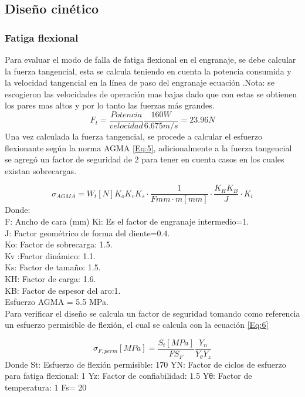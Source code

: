 \subsection*{Diseño cinético}
\subsubsection*{Fatiga flexional}
Para evaluar el modo de falla de fatiga flexional en el engranaje, se debe calcular la fuerza tangencial, esta se calcula teniendo en cuenta la potencia consumida y la velocidad tangencial en la línea de paso del engranaje ecuación .Nota: se escogieron las velocidades de operación mas bajas dado que con estas se obtienen los pares mas altos y por lo tanto las fuerzas más grandes.
\begin{equation}
F_{t} = \frac{Potencia}{velocidad}  
\frac{160W}{6.675 m/s}=23.96 N
\end{equation}
Una vez calculada la fuerza tangencial, se procede a calcular el esfuerzo flexionante según la norma AGMA  \ref{Eq:5}, adicionalmente a la fuerza tangencial se agregó un factor de seguridad de 2 para tener en cuenta casos en los cuales existan sobrecargas.

\begin{equation}
 \sigma_{AGMA}=W_{t}[N]K_{o}K_{v}K_{s}\cdot \frac{1}{F{mm}\cdot m[mm]} \cdot \frac{K_{H}K_{B}}{J} \cdot K_{i}
\label{Eq:5}    
\end{equation}
Donde:\\
F: Ancho de cara (mm)
Ki: Es el factor de engranaje intermedio=1.\\
J: Factor geométrico de forma del diente=0.4.\\
Ko: Factor de sobrecarga: 1.5.\\
Kv :Factor dinámico: 1.1.\\
Ks: Factor de tamaño: 1.5.\\
KH: Factor de carga: 1.6.\\
KB: Factor de espesor del aro:1.\\
Esfuerzo AGMA = 5.5 MPa.\\

Para verificar el diseño se calcula un factor de seguridad tomando como referencia un esfuerzo permisible de flexión, el cual se calcula con la ecuación \ref{Eq:6}

\begin{equation}
 \sigma_{F,perm}[MPa]=\frac{S_{t}[MPa]}{FS_{F}}  \frac{Y_{n}}{Y_{\theta}Y_{z}} 
\label{Eq:6}    
\end{equation}
Donde 
St: Esfuerzo de flexión permisible: 170
YN: Factor de ciclos de esfuerzo para fatiga flexional: 1
Yz: Factor de confiabilidad: 1.5
Yθ: Factor de temperatura: 1
Fs= 20 


